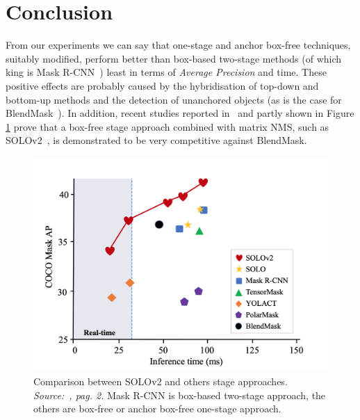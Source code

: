 \documentclass[10pt,twocolumn,letterpaper]{article}
\begin{document}
\section{Conclusion}
From our experiments we can say that one-stage and anchor box-free techniques, suitably modified, perform better than box-based two-stage methods (of which king is Mask R-CNN~\cite{Authors1_maskrcnn}) least in terms of \textit{Average Precision} and time. These positive effects are probably caused by the hybridisation of top-down and bottom-up methods and the detection of unanchored objects (as is the case for BlendMask~\cite{Authors2_BlendMask}). In addition, recent studies reported in~\cite{Authors6_SOLOv2} and partly shown in Figure \ref{fig:conclusionSOLOv2} prove that a box-free stage approach combined with matrix NMS, such as SOLOv2~\cite{Authors6_SOLOv2}, is demonstrated to be very competitive against BlendMask.
\begin{figure}[H]
\centering
  \includegraphics[width=0.7\linewidth]{./image/conclusion_SOLOv2.png}
  \caption{Comparison between SOLOv2 and others stage approaches. \textit{Source:~\cite{Authors6_SOLOv2}, pag. 2.} Mask R-CNN is box-based two-stage approach, the others are box-free or anchor box-free one-stage approach.} %
  \label{fig:conclusionSOLOv2}
\noindent
\end{figure}
\end{document}
